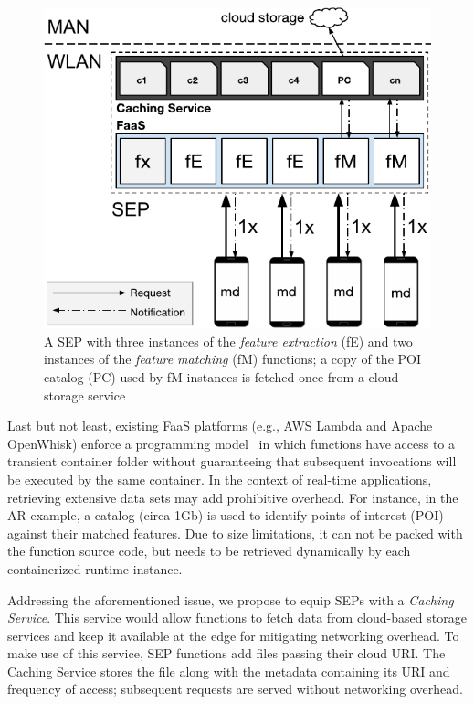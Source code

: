 \begin{figure}[tbp]
	\centering
	\includegraphics[width=0.97\linewidth]{Figs/Mobile_Computation_Offloading_Caching.pdf}
	\caption{A SEP with three instances of the \textit{feature extraction} (fE) and two instances of the \textit{feature matching} (fM) functions; a copy of the POI catalog (PC) used by fM instances is fetched once from a cloud storage service} 
	\label{fig:Mobile_Computation_Offloading_Caching}
\end{figure}

Last but not least, existing FaaS platforms (e.g., AWS Lambda and Apache OpenWhisk) enforce a programming model~\cite{AWSLambda,OpenWhisk} in which functions have access to a transient container folder without guaranteeing that subsequent invocations will be executed by the same container. %
In the context of real-time applications, retrieving extensive data sets may add prohibitive overhead. For instance, in the AR example, a catalog (circa 1Gb) is used to identify points of interest (POI) against their matched features. Due to size limitations, it can not be packed with the function source code, but needs to be retrieved dynamically by each containerized runtime instance.

Addressing the aforementioned issue, we propose to equip SEPs with a \textit{Caching Service}. This service would allow functions to fetch data from cloud-based storage services and keep it available at the edge for mitigating networking overhead. 
To make use of this service, SEP functions add files passing their cloud URI.
The Caching Service stores the file along with the metadata containing its URI and frequency of access; subsequent requests are served without networking overhead. 

